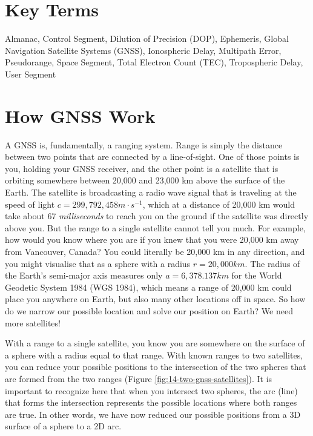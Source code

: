 \documentclass[
]{book}
\begin{document}
\hypertarget{key-terms-13}{%
\section*{Key Terms}\label{key-terms-13}}

Almanac, Control Segment, Dilution of Precision (DOP), Ephemeris, Global Navigation Satellite Systems (GNSS), Ionospheric Delay, Multipath Error, Pseudorange, Space Segment, Total Electron Count (TEC), Tropospheric Delay, User Segment

\hypertarget{how-gnss-work}{%
\section{How GNSS Work}\label{how-gnss-work}}

A GNSS is, fundamentally, a ranging system. Range is simply the distance between two points that are connected by a line-of-sight. One of those points is you, holding your GNSS receiver, and the other point is a satellite that is orbiting somewhere between 20,000 and 23,000 km above the surface of the Earth. The satellite is broadcasting a radio wave signal that is traveling at the speed of light \(c = 299,792,458 m·s^{-1}\), which at a distance of 20,000 km would take about 67 \emph{milliseconds} to reach you on the ground if the satellite was directly above you. But the range to a single satellite cannot tell you much. For example, how would you know where you are if you knew that you were 20,000 km away from Vancouver, Canada? You could literally be 20,000 km in any direction, and you might visualise that as a sphere with a radius \(r = 20,000 km\). The radius of the Earth's semi-major axis measures only \(a=6,378.137km\) for the World Geodetic System 1984 (WGS 1984), which means a range of 20,000 km could place you anywhere on Earth, but also many other locations off in space. So how do we narrow our possible location and solve our position on Earth? We need more satellites!

With a range to a single satellite, you know you are somewhere on the surface of a sphere with a radius equal to that range. With known ranges to two satellites, you can reduce your possible positions to the intersection of the two spheres that are formed from the two ranges (Figure \ref{fig:14-two-gnss-satellites}). It is important to recognize here that when you intersect two spheres, the arc (line) that forms the intersection represents the possible locations where both ranges are true. In other words, we have now reduced our possible positions from a 3D surface of a sphere to a 2D arc.
\end{document}
